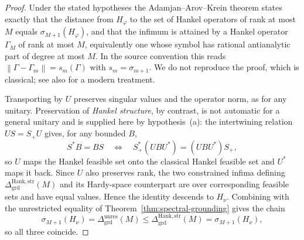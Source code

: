 \documentclass[12pt]{article}
\theoremstyle{definition}
\newcommand{\norm}[1]{\left\lVert#1\right\rVert}
\newcommand{\Dunres}{\Delta_{\mathrm{grd}}^{\mathrm{unres}}}
\newcommand{\DHankstr}{\Delta_{\mathrm{grd}}^{\mathrm{Hank,str}}}
\begin{document}
\begin{proof}
Under the stated hypotheses the Adamjan--Arov--Krein theorem
\cite{aak1971} states exactly that the distance from $H_\varphi$ to the set of
Hankel operators of rank at most $M$ equals $\sigma_{M+1}(H_\varphi)$, and that
the infimum is attained by a Hankel operator $\Gamma_M$ of rank at most $M$,
equivalently one whose symbol has rational antianalytic part of degree at most
$M$.  In the source convention this reads $\norm{\Gamma-\Gamma_m}=s_m(\Gamma)$
with $s_m=\sigma_{m+1}$.  We do not reproduce the proof, which is classical;
see also \cite{peller2003} for a modern treatment.

Transporting by $U$ preserves singular values and the operator norm, as for
any unitary.  Preservation of \emph{Hankel structure}, by contrast, is not
automatic for a general unitary and is supplied here by hypothesis~(a): the
intertwining relation $US=S_+U$ gives, for any bounded $B$,
\[
S^{*}B=BS
\quad\Longleftrightarrow\quad
S_+^{*}(UBU^{*})=(UBU^{*})S_+,
\]
so $U$ maps the Hankel feasible set onto the classical Hankel feasible set and
$U^{*}$ maps it back.  Since $U$ also preserves rank, the two constrained
infima defining $\DHankstr(M)$ and its Hardy-space counterpart are over
corresponding feasible sets and have equal values.  Hence the identity
descends to $H_\nu$.
Combining with the unrestricted equality of
Theorem~\ref{thm:spectral-grounding} gives the chain
\[
\sigma_{M+1}(H_\nu)
=
\Dunres(M)
\le
\DHankstr(M)
=
\sigma_{M+1}(H_\nu),
\]
so all three coincide.
\end{proof}
\end{document}
